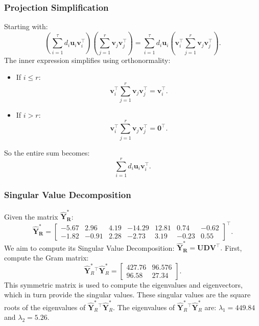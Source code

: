 \documentclass[11pt]{report} %
\begin{document}
\subsubsection{Projection Simplification}
\label{proj}
Starting with:
\[
\left( \sum_{i=1}^{\tau} d_i \mathbf{u}_i \mathbf{v}_i^\top \right)
\left( \sum_{j=1}^{r} \mathbf{v}_j \mathbf{v}_j^\top \right)
= \sum_{i=1}^{\tau} d_i \mathbf{u}_i 
\left( \mathbf{v}_i^\top \sum_{j=1}^{r} \mathbf{v}_j \mathbf{v}_j^\top \right).
\]
The inner expression simplifies using orthonormality:
\begin{itemize}
  \item If \( i \leq r \): 
  \[
  \mathbf{v}_i^\top \sum_{j=1}^{r} \mathbf{v}_j \mathbf{v}_j^\top = \mathbf{v}_i^\top.
  \]
  \item If \( i > r \): 
  \[
  \mathbf{v}_i^\top \sum_{j=1}^{r} \mathbf{v}_j \mathbf{v}_j^\top = \mathbf{0}^\top.
  \]
\end{itemize}
\noindent So the entire sum becomes:
\[
\sum_{i=1}^{r} d_i \mathbf{u}_i \mathbf{v}_i^\top.
\]

\subsubsection{Singular Value Decomposition}
\label{RRR SVD}
Given the matrix \( \mathbf{\hat{Y}^*_R} \):
\[
\mathbf{\hat{Y}^*_R} =
\begin{bmatrix}
-5.67 & 2.96 & 4.19 & -14.29 & 12.81 & 0.74 & -0.62 \\
-1.82 & -0.91 & 2.28 & -2.73 & 3.19 & -0.23 & 0.55
\end{bmatrix}^{\top}.
\]
We aim to compute its Singular Value Decomposition: 
$
\mathbf{\hat{Y}^*_R} = \mathbf{U D V}^\top.
$
First, compute the Gram matrix:
\[
\hat{\mathbf{Y}}_R^*{}^\top \hat{\mathbf{Y}}_R^* =
\begin{bmatrix}
427.76 & 96.576 \\
96.58 & 27.34
\end{bmatrix}.
\]
This symmetric matrix is used to compute the eigenvalues and eigenvectors, which in turn provide the singular values. These singular values are the square roots of the eigenvalues of \( \hat{\mathbf{Y}}_R^*{}^\top \hat{\mathbf{Y}}_R^* \). The eigenvalues of \( \hat{\mathbf{Y}}_R^*{}^\top \hat{\mathbf{Y}}_R^* \) are: \( \lambda_1 = 449.84 \) and \( \lambda_2 = 5.26 \).
\end{document}

